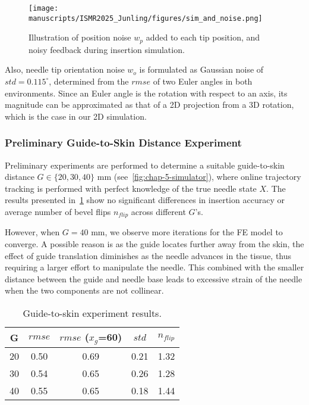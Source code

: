 \begin{figure}[h]
  \centering
  \texttt{[image: manuscripts/ISMR2025\_Junling/figures/sim\_and\_noise.png]}
  \caption{Illustration of position noise $w_p$ added to each tip position, and noisy feedback during insertion simulation.} 
  \label{fig:chap-5-needle-sensor-scatter}
\end{figure}

Also, needle tip orientation noise $w_o$ is formulated as Gaussian noise of $std = 0.115^\circ$, determined from the $rmse$ of two Euler angles in both environments. Since an Euler angle is the rotation with respect to an axis, its magnitude can be approximated as that of a 2D projection from a 3D rotation, which is the case in our 2D simulation.

\subsubsection{Preliminary Guide-to-Skin Distance Experiment}
\label{sec:chap-5-preliminary}

Preliminary experiments are performed to determine a suitable guide-to-skin distance $G \in \{20, 30, 40\}$ mm (see~\cref{fig:chap-5-simulator}), where online trajectory tracking is performed with perfect knowledge of the true needle state $X$. The results presented in~\cref{tab:chap-5-guide-errors} show no significant differences in insertion accuracy or average number of bevel flips $n_{flip}$ across different $G$'s. 

However, when $G = 40$ mm, we observe more iterations for the FE model to converge. A possible reason is as the guide locates further away from the skin, the effect of guide translation diminishes as the needle advances in the tissue, thus requiring a larger effort to manipulate the needle. This combined with the smaller distance between the guide and needle base leads to excessive strain of the needle when the two components are not collinear.

\begin{table}[h]
\centering
\caption{Guide-to-skin experiment results.}
\label{tab:chap-5-guide-errors}
\begin{tabular}{c|c c c c}
\toprule
G &  $rmse$  & $rmse$ ($x_g$=60) & $std$ & $n_{flip}$    \\
\midrule
20    & 0.50 & 0.69 & 0.21 & 1.32         \\
30    & 0.54 & 0.65 & 0.26 & 1.28         \\
40    & 0.55 & 0.65 & 0.18 & 1.44         \\
\bottomrule
\end{tabular}
\end{table}


